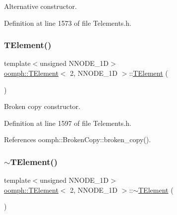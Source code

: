Alternative constructor. 



Definition at line 1573 of file Telements.\+h.

\mbox{\label{classoomph_1_1TElement_3_012_00_01NNODE__1D_01_4_ae3eb1ea12648eff3cc688888ded91a03}} 
\subsubsection{\texorpdfstring{T\+Element()}{TElement()}\hspace{0.1cm}{\footnotesize\ttfamily [3/3]}}
{\footnotesize\ttfamily template$<$unsigned N\+N\+O\+D\+E\+\_\+1D$>$ \\
\hyperlink{classoomph_1_1TElement}{oomph\+::\+T\+Element}$<$ 2, N\+N\+O\+D\+E\+\_\+1D $>$\+::\hyperlink{classoomph_1_1TElement}{T\+Element} (\begin{DoxyParamCaption}\item[{const \hyperlink{classoomph_1_1TElement}{T\+Element}$<$ 2, N\+N\+O\+D\+E\+\_\+1D $>$ \&}]{ }\end{DoxyParamCaption})\hspace{0.3cm}{\ttfamily [inline]}}



Broken copy constructor. 



Definition at line 1597 of file Telements.\+h.



References oomph\+::\+Broken\+Copy\+::broken\+\_\+copy().

\mbox{\label{classoomph_1_1TElement_3_012_00_01NNODE__1D_01_4_a7ff2fe1600e3d50ad1f597a3d5076443}} 
\subsubsection{\texorpdfstring{$\sim$\+T\+Element()}{~TElement()}}
{\footnotesize\ttfamily template$<$unsigned N\+N\+O\+D\+E\+\_\+1D$>$ \\
\hyperlink{classoomph_1_1TElement}{oomph\+::\+T\+Element}$<$ 2, N\+N\+O\+D\+E\+\_\+1D $>$\+::$\sim$\hyperlink{classoomph_1_1TElement}{T\+Element} (\begin{DoxyParamCaption}{ }\end{DoxyParamCaption})\hspace{0.3cm}{\ttfamily [inline]}}




